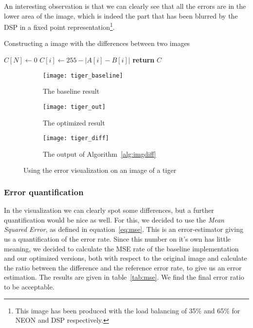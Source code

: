 An interesting observation is that we can clearly see that all the errors are in the lower area of the image, which is indeed the part that has been blurred by the DSP in a fixed point representation\footnote{This image has been produced with the load balancing of 35\% and 65\% for NEON and DSP respectively.}.

\begin{algorithm}[t]
    \caption{Constructing a image with the differences between two images}\label{alg:imgdiff}
    \begin{algorithmic}[1]
        \State $C[N]\gets 0$
           \State $C[i]\gets 255 - |A[i] - B[i]|$
        \EndFor
        \State \textbf{return} $C$
        \EndProcedure
    \end{algorithmic}
\end{algorithm}

\begin{figure*}
    \centering
    \begin{subfigure}[b]{0.3\textwidth}
            \texttt{[image: tiger\_baseline]}
            \caption{The baseline result}
            \label{fig:er_tiger_baseline}
    \end{subfigure}
    \begin{subfigure}[b]{0.3\textwidth}
            \texttt{[image: tiger\_out]}
            \caption{The optimized result}
            \label{fig:er_tiger_out}
    \end{subfigure}
    \begin{subfigure}[b]{0.3\textwidth}
            \texttt{[image: tiger\_diff]}
            \caption{The output of Algorithm~\ref{alg:imgdiff}}
            \label{fig:er_tiger_diff}
    \end{subfigure}
    \caption{Using the error visualization on an image of a tiger}
    \label{fig:imgdiff}
\end{figure*}

\subsubsection{Error quantification}
In the visualization we can clearly spot some differences, but a further quantification would be nice as well. For this, we decided to use the \emph{Mean Squared Error}, as defined in equation~\ref{eq:mse}. This is an error-estimator giving us a quantification of the error rate. Since this number on it's own has little meaning, we decided to calculate the MSE rate of the baseline implementation and our optimized versions, both with respect to the original image and calculate the ratio between the difference and the reference error rate, to give us an error estimation. The results are given in table~\ref{tab:mse}. We find the final error ratio to be acceptable.

